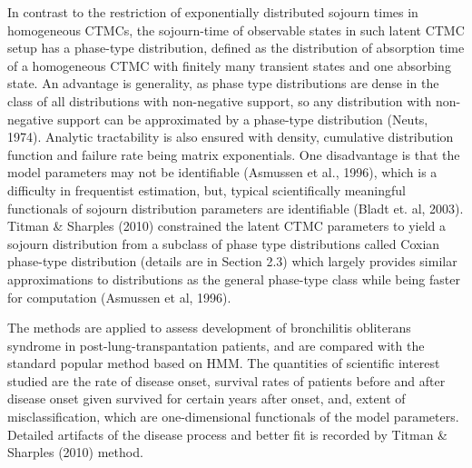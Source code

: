 \documentclass{uwstat572}
\begin{document}
In contrast to the restriction of exponentially distributed sojourn times in homogeneous CTMCs, the sojourn-time of observable states in such latent CTMC setup has a phase-type distribution, defined as the distribution of absorption time of a homogeneous CTMC with finitely many transient states and one absorbing state. An advantage is generality, as phase type distributions are dense in the class of all distributions with non-negative support, so any distribution with non-negative support can be approximated by a phase-type distribution (Neuts, 1974). Analytic tractability is also ensured with density, cumulative distribution function and failure rate being matrix exponentials. One disadvantage is that the model parameters may not be identifiable (Asmussen et al., 1996), which is a difficulty in frequentist estimation, but, typical scientifically meaningful functionals of sojourn distribution parameters are identifiable (Bladt et. al, 2003). Titman \& Sharples (2010) constrained the latent CTMC parameters to yield a sojourn distribution from a subclass of phase type distributions called Coxian phase-type distribution (details are in Section 2.3) which largely provides similar approximations to distributions as the general phase-type class while being faster for computation (Asmussen et al, 1996).

The methods are applied to assess development of bronchilitis obliterans syndrome in post-lung-transpantation patients, and are compared with the standard popular method based on HMM. The quantities of scientific interest studied are the rate of disease onset, survival rates of patients before and after disease onset given survived for certain years after onset, and, extent of misclassification, which are one-dimensional functionals of the model parameters. Detailed artifacts of the disease process and better fit is recorded by Titman \& Sharples (2010) method.
\end{document}
